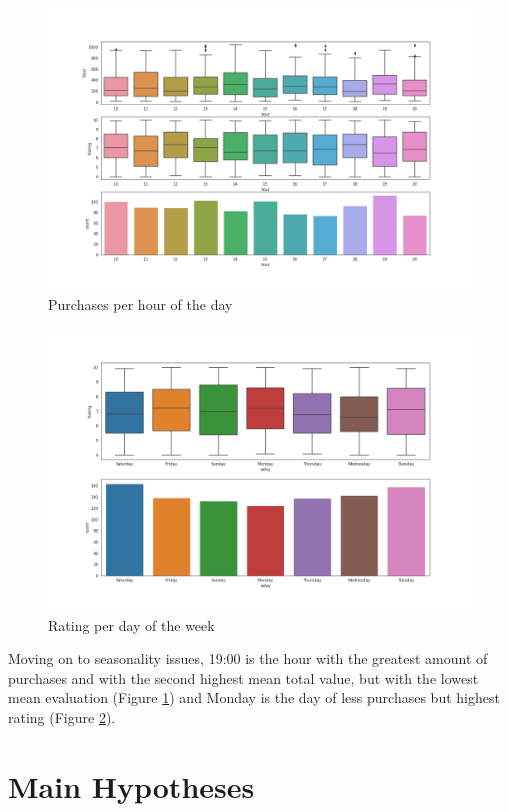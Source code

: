\documentclass[11pt, a4]{article}
\begin{document}
\begin{figure}[!h]
\includegraphics[scale=0.35]{hour}
\centering
\caption{Purchases per hour of the day}
\label{fig:hour}
\end{figure}

\begin{figure}
\includegraphics[scale=0.35]{week}
\centering
\caption{Rating per day of the week}
\label{fig:week}
\end{figure}


Moving on to seasonality issues, 19:00 is the hour with the greatest amount of purchases and with the second highest mean total value, but with the lowest mean evaluation (Figure \ref{fig:hour}) and Monday is the day of less purchases but highest rating (Figure \ref{fig:week}).



\section*{Main Hypotheses}
\end{document}
